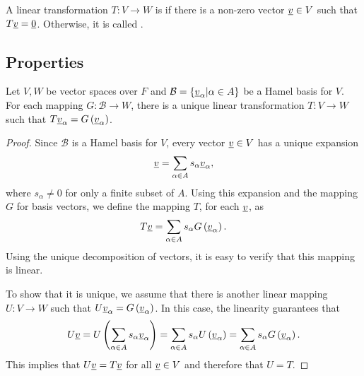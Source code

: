 \begin{definition}
A linear transformation $T: V \rightarrow W$ is  if there is a non-zero vector $\underline{v} \in V$ such that $T \underline{v} = \underline{0}$.
Otherwise, it is called .
\end{definition}

\subsection{Properties}

\begin{theorem} \label{theorem:UniqueLinearTransformation}
Let $V,W$ be vector spaces over $F$ and $\mathcal{B} = \{ \underline{v}_{\alpha} | \alpha \in A \}$ be a Hamel basis for $V$.
For each mapping $G: \mathcal{B} \rightarrow W$, there is a unique linear transformation $T: V \rightarrow W$ such that $T \underline{v}_{\alpha} = G \left( \underline{v}_{\alpha} \right)$.
\end{theorem}
\begin{proof}
Since $\mathcal{B}$ is a Hamel basis for $V$, every vector $\underline{v} \in V$ has a unique expansion
\begin{equation*}
\underline{v} = \sum_{\alpha \in A} s_{\alpha} \underline{v}_{\alpha},
\end{equation*}
where $s_{\alpha} \neq 0$ for only a finite subset of $A$.
Using this expansion and the mapping $G$ for basis vectors, we define the mapping $T$, for each $\underline{v}$, as
\begin{equation*}
T \underline{v} = \sum_{\alpha \in A} s_{\alpha} G \left( \underline{v}_{\alpha} \right).
\end{equation*}
Using the unique decomposition of vectors, it is easy to verify that this mapping is linear.

To show that it is unique, we assume that there is another linear mapping $U : V \rightarrow W$ such that $U \underline{v}_{\alpha} = G \left( \underline{v}_{\alpha} \right)$.
In this case, the linearity guarantees that
\begin{equation*}
U \underline{v} = U \left( \sum_{\alpha \in A} s_{\alpha} \underline{v}_{\alpha} \right)
=  \sum_{\alpha \in A} s_{\alpha} U \left( \underline{v}_{\alpha} \right) 
=  \sum_{\alpha \in A} s_{\alpha} G \left( \underline{v}_{\alpha} \right).
\end{equation*}
This implies that $U \underline{v} = T \underline{v}$ for all $\underline{v} \in V$ and therefore that $U = T$.
\end{proof}

